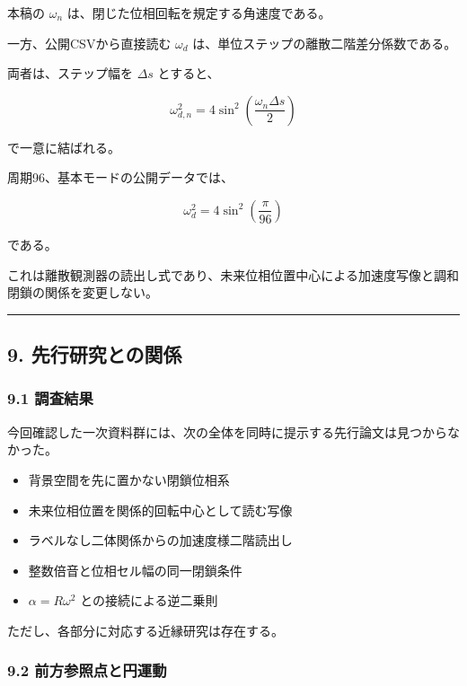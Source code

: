 \documentclass[
  a4paper,
]{ltjsarticle}
\providecommand{\tightlist}{%
  \setlength{\itemsep}{0pt}\setlength{\parskip}{0pt}}
\begin{document}
本稿の \(\omega_n\) は、閉じた位相回転を規定する角速度である。

一方、公開CSVから直接読む \(\omega_d\)
は、単位ステップの離散二階差分係数である。

両者は、ステップ幅を \(\Delta s\) とすると、

\[
\omega_{d,n}^2
=4\sin^2\left(\frac{\omega_n\Delta s}{2}\right)
\]

で一意に結ばれる。

周期96、基本モードの公開データでは、

\[
\omega_d^2
=4\sin^2\left(\frac{\pi}{96}\right)
\]

である。

これは離散観測器の読出し式であり、未来位相位置中心による加速度写像と調和閉鎖の関係を変更しない。

\begin{center}\rule{0.5\linewidth}{0.5pt}\end{center}

\subsection{9.
先行研究との関係}\label{ux5148ux884cux7814ux7a76ux3068ux306eux95a2ux4fc2}

\subsubsection{9.1 調査結果}\label{ux8abfux67fbux7d50ux679c}

今回確認した一次資料群には、次の全体を同時に提示する先行論文は見つからなかった。

\begin{itemize}
\tightlist
\item
  背景空間を先に置かない閉鎖位相系
\item
  未来位相位置を関係的回転中心として読む写像
\item
  ラベルなし二体関係からの加速度様二階読出し
\item
  整数倍音と位相セル幅の同一閉鎖条件
\item
  \(\alpha=R\omega^2\) との接続による逆二乗則
\end{itemize}

ただし、各部分に対応する近縁研究は存在する。

\subsubsection{9.2
前方参照点と円運動}\label{ux524dux65b9ux53c2ux7167ux70b9ux3068ux5186ux904bux52d5}
\end{document}
